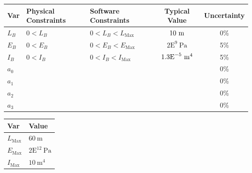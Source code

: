 \documentclass[12pt]{article}
\begin{document}
\begin{table}[H]
    \caption{Input Variables} \label{TblInputVar}
    \renewcommand{\arraystretch}{1.2}
    \noindent
    \begin{longtable}{l l l c c}
        \toprule
        \textbf{Var} & \textbf{Physical Constraints} & \textbf{Software Constraints} & \textbf{Typical Value}                            & \textbf{Uncertainty} \\
        \midrule
        $L_B$        & $0 < L_B$                     & $0 < L_B < L_\text{Max}$      & $10~\si[per-mode=symbol]{\metre}$                 & 0\%                  \\
        $E_B$        & $0 < E_B$                     & $0 < E_B < E_\text{Max}$      & $2\text{E}^9~\si{\pascal}$                        & 5\%                  \\
        $I_B$        & $0 < I_B$                     & $0 < I_B < I_\text{Max}$      & $1.3\text{E}^{-5}~\si[per-mode=symbol]{\metre}^4$ & 5\%                  \\
        $a_0$        & \textemdash{}                 & \textemdash{}                 & \textemdash{}                                     & 0\%                  \\
        $a_1$        & \textemdash{}                 & \textemdash{}                 & \textemdash{}                                     & 0\%                  \\
        $a_2$        & \textemdash{}                 & \textemdash{}                 & \textemdash{}                                     & 0\%                  \\
        $a_3$        & \textemdash{}                 & \textemdash{}                 & \textemdash{}                                     & 0\%                  \\
        \bottomrule
    \end{longtable}
\end{table}

\begin{table}[H]
    \caption{Specification Parameter Values} \label{TblSpecParams}
    \renewcommand{\arraystretch}{1.2}
    \noindent \begin{longtable}{l l}
        \toprule
        \textbf{Var}   & \textbf{Value}                \\
        \midrule
        $L_\text{Max}$ & $60~\si{\metre}$ \\
        $E_\text{Max}$ & $2\text{E}^{12}~\si{\pascal}$ \\
        $I_\text{Max}$ & $10~\si{\metre}^4$ \\
        \bottomrule
    \end{longtable}
\end{table}
\end{document}

